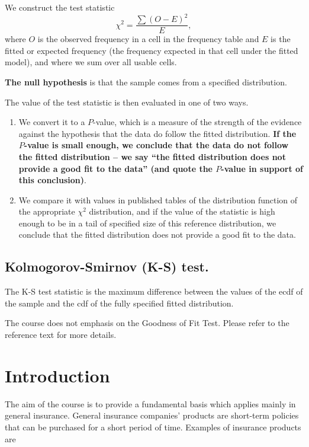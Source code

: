 \documentclass[
]{book}
\theoremstyle{definition}
\theoremstyle{definition}
\theoremstyle{definition}
\theoremstyle{definition}
\theoremstyle{remark}
\begin{document}
We construct the test statistic \[\chi^2 = \frac{\sum(O - E)^2}{E},\]
where \(O\) is the observed frequency in a cell in the frequency table and
\(E\) is the fitted or expected frequency (the frequency expected in that
cell under the fitted model), and where we sum over all usable cells.

\textbf{The null hypothesis} is that the sample comes from a specified
distribution.

The value of the test statistic is then evaluated in one of two ways.

\begin{enumerate}
\def\labelenumi{\arabic{enumi}.}
\item
  We convert it to a \(P\)-value, which is a measure of the strength of
  the evidence against the hypothesis that the data do follow the
  fitted distribution. \textbf{If the \(P\)-value is small enough, we conclude
  that the data do not follow the fitted distribution -- we say ``the
  fitted distribution does not provide a good fit to the data'' (and
  quote the \(P\)-value in support of this conclusion)}.
\item
  We compare it with values in published tables of the distribution
  function of the appropriate \(\chi^2\) distribution, and if the value
  of the statistic is high enough to be in a tail of specified size of
  this reference distribution, we conclude that the fitted
  distribution does not provide a good fit to the data.
\end{enumerate}

\hypertarget{kolmogorov-smirnov-k-s-test.}{%
\section{Kolmogorov-Smirnov (K-S) test.}\label{kolmogorov-smirnov-k-s-test.}}

The K-S test statistic is the maximum difference between the values of
the ecdf of the sample and the cdf of the fully specified fitted
distribution.

The course does not emphasis on the Goodness of Fit Test. Please refer
to the reference text for more details.

\hypertarget{introduction}{%
\chapter{Introduction}\label{introduction}}

The aim of the course is to provide a fundamental basis which applies
mainly in general insurance. General insurance companies' products are
short-term policies that can be purchased for a short period of time.
Examples of insurance products are
\end{document}
